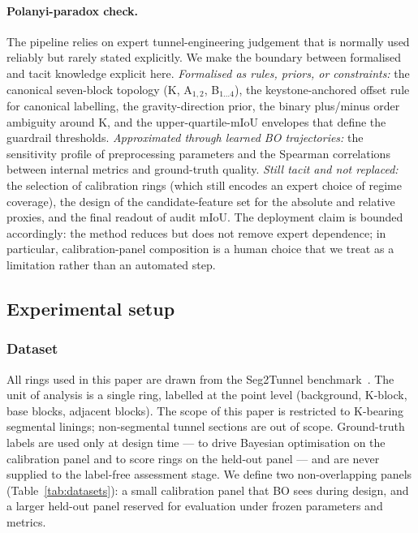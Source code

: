 \documentclass[a4paper,fleqn]{cas-dc}
\begin{document}
\paragraph{Polanyi-paradox check.}
The pipeline relies on expert tunnel-engineering judgement that is normally used reliably but rarely stated explicitly. We make the boundary between formalised and tacit knowledge explicit here. \textit{Formalised as rules, priors, or constraints:} the canonical seven-block topology (K, A$_{1,2}$, B$_{1\ldots 4}$), the keystone-anchored offset rule for canonical labelling, the gravity-direction prior, the binary plus/minus order ambiguity around K, and the upper-quartile-mIoU envelopes that define the guardrail thresholds. \textit{Approximated through learned BO trajectories:} the sensitivity profile of preprocessing parameters and the Spearman correlations between internal metrics and ground-truth quality. \textit{Still tacit and not replaced:} the selection of calibration rings (which still encodes an expert choice of regime coverage), the design of the candidate-feature set for the absolute and relative proxies, and the final readout of audit mIoU. The deployment claim is bounded accordingly: the method reduces but does not remove expert dependence; in particular, calibration-panel composition is a human choice that we treat as a limitation rather than an automated step.


\subsection{Experimental setup}\label{sec:exp-setup}

\subsubsection{Dataset}\label{sec:dataset}

All rings used in this paper are drawn from the Seg2Tunnel benchmark~\cite{ye2025sam4tun}. The unit of analysis is a single ring, labelled at the point level (background, K-block, base blocks, adjacent blocks). The scope of this paper is restricted to K-bearing segmental linings; non-segmental tunnel sections are out of scope. Ground-truth labels are used only at design time --- to drive Bayesian optimisation on the calibration panel and to score rings on the held-out panel --- and are never supplied to the label-free assessment stage. We define two non-overlapping panels (Table~\ref{tab:datasets}): a small calibration panel that BO sees during design, and a larger held-out panel reserved for evaluation under frozen parameters and metrics.
\end{document}
